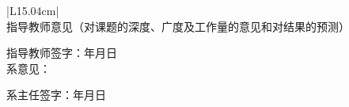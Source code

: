 \documentclass[a4paper,zihao=-4]{ctexart}
\begin{document}
{\songti
\begin{center}
\begin{tabular}{|L{15.04cm}|}
\hline
指导教师意见（对课题的深度、广度及工作量的意见和对结果的预测）\par
\vspace{6.0cm}
\hfill 指导教师签字：\hspace{3.5cm}年\hspace{0.7cm}月\hspace{0.7cm}日 \\
\hline
系意见：\par
\vspace{5.0cm}
\hfill 系主任签字：\hspace{3.5cm}年\hspace{0.7cm}月\hspace{0.7cm}日 \\
\hline
\end{tabular}
\end{center}
}
\end{document}

